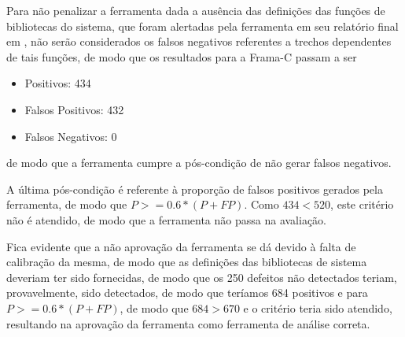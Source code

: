       Para não penalizar a ferramenta dada a ausência das definições das funções de bibliotecas do sistema, que foram alertadas pela ferramenta em seu relatório final em , não serão considerados os falsos negativos referentes a trechos dependentes de tais funções, de modo que os resultados para a Frama-C passam a ser
      \begin{itemize}
        \item Positivos: 434
        \item Falsos Positivos: 432
        \item Falsos Negativos: 0
      \end{itemize}
      de modo que a ferramenta cumpre a pós-condição de não gerar falsos negativos.

      A última pós-condição é referente à proporção de falsos positivos gerados pela ferramenta, de modo que
      $P >= 0.6*(P + FP)$.
      Como 
      $434 < 520$,
      este critério não é atendido, de modo que a ferramenta não passa na avaliação.

      Fica evidente que a não aprovação da ferramenta se dá devido à falta de calibração da mesma, de modo que as definições das bibliotecas de sistema deveriam ter sido fornecidas, de modo que os 250 defeitos não detectados teriam, provavelmente, sido detectados, de modo que teríamos 684 positivos e para
      $P >= 0.6*(P + FP)$,
      de modo que
      $684 > 670$
      e o critério teria sido atendido, resultando na aprovação da ferramenta como ferramenta de análise correta.

